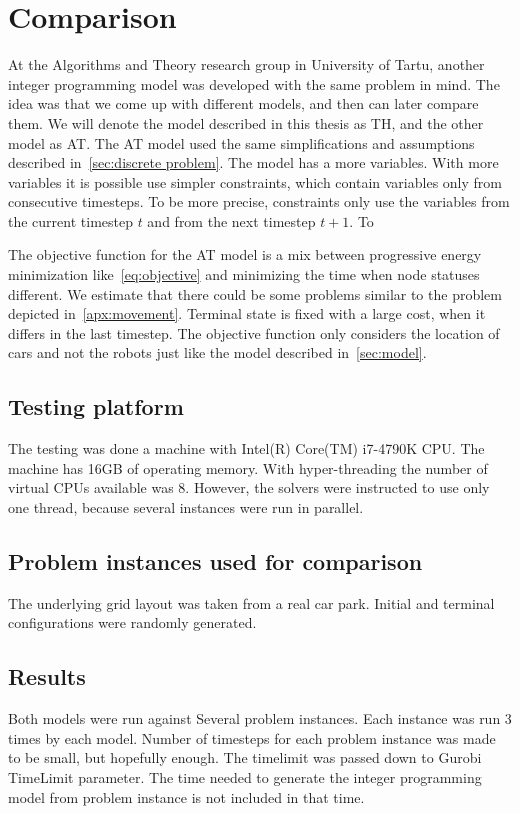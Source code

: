 \section{Comparison}
At the Algorithms and Theory research group in University of Tartu, another
integer programming model was developed with the same problem in mind. The
idea was that we come up with different models, and then can later compare
them. We will denote the model described in this thesis as TH, and the other
model as AT. The AT model used the same simplifications and assumptions described
in~\autoref{sec:discrete problem}. The model has a more variables. With more
variables it is possible use simpler constraints, which contain variables only
from consecutive timesteps. To be more precise, constraints only use the
variables from the current timestep $t$ and from the next timestep $t+1$. To

The objective function for the AT model is a mix between progressive
energy minimization like~\eqref{eq:objective} and minimizing the time when node
statuses different. We estimate that there could be some problems similar to the problem
depicted in~\autoref{apx:movement}. Terminal state is fixed with a large cost,
when it differs in the last timestep. The objective function only considers the
location of cars and not the robots just like the model described
in~\autoref{sec:model}.

\subsection{Testing platform}
The testing was done a machine with Intel(R) Core(TM) i7-4790K CPU.  The
machine has 16GB of operating memory. With hyper-threading the number of
virtual CPUs available was 8. However, the solvers were instructed to use only
one thread, because several instances were run in parallel.

\subsection{Problem instances used for comparison}
The underlying grid layout was taken from a real car park. Initial and terminal
configurations were randomly generated.

\subsection{Results}
Both models were run against Several problem instances. Each instance was run 3
times by each model. Number of timesteps for each problem instance was made to
be small, but hopefully enough. The timelimit was passed down to Gurobi
TimeLimit parameter. The time needed to generate the integer programming model
from problem instance is not included in that time.

